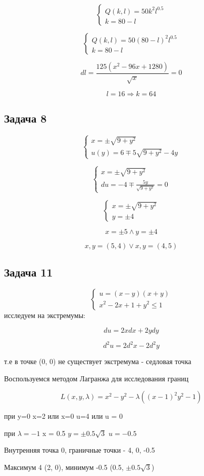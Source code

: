 \documentclass[a4paper,12pt]{article}
\begin{document}
\[
\begin{cases}
	Q(k, l) = 50k^2l^{0.5} \\
	k=80-l
\end{cases}
\]

\[
	\begin{cases}
		Q(k, l) = 50(80-l)^2l^{0.5}\\
		k=80-l
	\end{cases}
\]

\[
dl = \frac{125(x^2-96x+1280)}{\sqrt{x}} = 0
\]

\[
l = 16 \Rightarrow k = 64
\]

\subsection{Задача 8}

\[
\begin{cases}
	x = \pm\sqrt{9+y^2} \\
	u(y) = 6 \mp 5\sqrt{9+y^2} - 4y
\end{cases}
\]

\[
	\begin{cases}
		x = \pm\sqrt{9+y^2} \\
		du = -4 \mp \frac{5y}{\sqrt{9+y^2}} = 0
	\end{cases}
\]

\[
\begin{cases}
	x = \pm \sqrt{9+y^2} \\
	y = \pm 4
\end{cases}
\]

\[
x = \pm 5 \land y = \pm 4
\]

\[
x, y = (5, 4) \lor x, y = (4, 5)
\]

\subsection{Задача 11}
\[
\begin{cases}
	u=(x-y)(x+y) \\
	x^2-2x+1+y^2\le 1
\end{cases}
\]
исследуем на экстремумы:

\[
du = 2xdx+2ydy
\]

\[
d^2u = 2d^2x-2d^2y
\]

т.е в точке (0, 0) не существует экстремума - седловая точка


Воспользуемся методом Лагранжа для исследования границ

\[
L(x, y, \lambda) = x^2-y^2-\lambda((x-1)^2y^2-1)
\]

при y=0 x=2 или x=0 u=4 или u = 0

при $\lambda = -1$ x = 0.5 $y = \pm 0.5\sqrt{3}$ $u=-0.5$

Внутренняя точка 0, граничные точки - 4, 0, -0.5

Максимум 4 (2, 0), минимум -0.5 (0.5, $\pm 0.5\sqrt{3}$)
\end{document}
